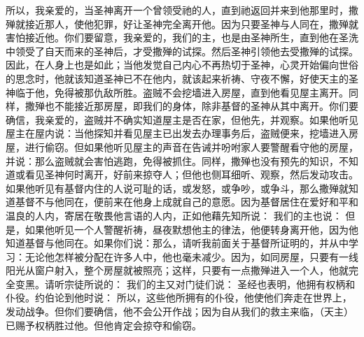所以，我亲爱的，当圣神离开一个曾领受祂的人，直到祂返回并来到他那里时，撒殚就接近那人，使他犯罪，好让圣神完全离开他。因为只要圣神与人同在，撒殚就害怕接近他。你们要留意，我亲爱的，我们的主，也是由圣神所生，直到他在圣洗中领受了自天而来的圣神后，才受撒殚的试探。然后圣神引领他去受撒殚的试探。因此，在人身上也是如此；当他发觉自己内心不再热切于圣神，心灵开始偏向世俗的思念时，他就该知道圣神已不在他内，就该起来祈祷、守夜不懈，好使天主的圣神临于他，免得被那仇敌所胜。盗贼不会挖墙进入房屋，直到他看见屋主离开。同样，撒殚也不能接近那房屋，即我们的身体，除非基督的圣神从其中离开。你们要确信，我亲爱的，盗贼并不确实知道屋主是否在家，但他先，并观察。如果他听见屋主在屋内说：当他探知并看见屋主已出发去办理事务后，盗贼便来，挖墙进入房屋，进行偷窃。但如果他听见屋主的声音在告诫并吩咐家人要警醒看守他的房屋，并说：那么盗贼就会害怕逃跑，免得被抓住。同样，撒殚也没有预先的知识，不知道或看见圣神何时离开，好前来掠夺人；但他也侧耳细听、观察，然后发动攻击。如果他听见有基督内住的人说可耻的话，或发怒，或争吵，或争斗，那么撒殚就知道基督不与他同在，便前来在他身上成就自己的意愿。因为基督居住在爱好和平和温良的人内，寄居在敬畏他言语的人内，正如他藉先知所说： 我们的主也说： 但是，如果他听见一个人警醒祈祷，昼夜默想他主的律法，他便转身离开他，因为他知道基督与他同在。如果你们说：那么，请听我前面关于基督所证明的，并从中学习：无论他怎样被分配在许多人中，他也毫未减少。因为，如同房屋，只要有一线阳光从窗户射入，整个房屋就被照亮；这样，只要有一点撒殚进入一个人，他就完全变黑。请听宗徒所说的： 我们的主又对门徒们说： 圣经也表明，他拥有权柄和仆役。约伯论到他时说： 所以，这些他所拥有的仆役，他使他们奔走在世界上，发动战争。但你们要确信，他不会公开作战；因为自从我们的救主来临，（天主）已赐予权柄胜过他。但他肯定会掠夺和偷窃。\par


